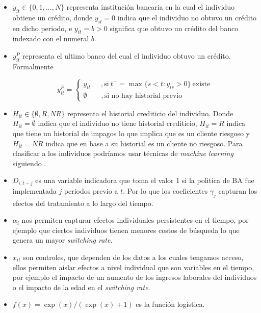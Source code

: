 \documentclass[11pt]{article}
\theoremstyle{plain}
\theoremstyle{plain}
\begin{document}
\begin{itemize}
    \item $y_{it} \in \{0, 1, ..., N\}$ representa institución bancaria en la cual el individuo obtiene un crédito, donde $y_{it} = 0$ indica que el individuo no obtuvo un crédito en dicho periodo, e $y_{it} = b>0$ significa que obtuvo un crédito del banco indexado con el numeral $b$. 
    \item $y_{it}^P$ representa el ultimo banco del cual el individuo obtuvo un crédito. Formalmente 
    
    $$y_{it}^P =  \begin{cases}
        y_{it^-}\quad,  \text{si} \  t^- = \max\{s<t: y_{is}>0\} \ \text{existe} \\
        \emptyset \quad \quad , \text{si no hay historial previo}
    \end{cases}$$ 
    
    \item $H_{it}\in \{\emptyset, R, NR\}$ representa el historial crediticio del individuo. Donde $H_{it} =\emptyset$ indica que el individuo no tiene historial crediticio, $H_{it}= R$ indica que tiene un historial de impagos lo que implica que es un cliente riesgoso y $H_{it}= NR$ indica que en base a su historial es un cliente no riesgoso. Para clasificar a los individuos podríamos usar técnicas de \textit{machine learning} siguiendo \textcite{liberman_equilibrium_2018}.  
    
    \item $D_{i, t-j}$ es una variable indicadora que toma el valor 1 si la politica de BA fue implementada $j$ periodos previo a $t$. Por lo que los coeficientes $\gamma_j$ capturan los efectos del tratamiento a lo largo del tiempo. 

    \item $\alpha_i$ nos permiten capturar efectos individuales persistentes en el tiempo, por ejemplo que ciertos individuos tienen menores costos de búsqueda lo que genera un mayor \textit{switching rate}.

    \item $x_{it}$ son controles, que dependen de los datos a los cuales tengamos acceso, ellos permiten aislar efectos a nivel individual que son variables en el tiempo, por ejemplo el impacto de un aumento de los ingresos laborales del individuos o el impacto de la edad en el \textit{switching rate}. 

    \item $f(x) = \exp(x)/(\exp(x) +1)$ es la función logística.
\end{itemize}
\end{document}
